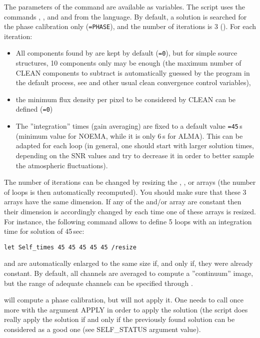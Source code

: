 The parameters of the command  are available as 
 \sic{} variables.  The script uses the commands 
, , and   and  from the 
 language. By default, a solution is searched for the 
phase calibration only (\texttt{=PHASE}), and 
the number of iterations is 3 (). For each 
iteration: 
\begin{itemize}\itemsep 0pt
\item All components found by  are kept by default 
(\texttt{=0}), but for simple source structures, 10 components only 
may be enough (the maximum number  of  CLEAN components to 
subtract is automatically guessed by the program in the default 
process, see  and other usual clean convergence control 
variables),
\item the minimum flux density per pixel to be considered by CLEAN can 
be defined (\texttt{=0}) 
\item The ''integration'' times (gain averaging) are fixed to a default 
value \texttt{=45}\,s (minimum value for NOEMA, while it is only 
6\,s for ALMA). This can be adapted for each loop (in general, one 
should start with larger solution times, depending on the SNR values 
and try to decrease it in order to better sample the atmospheric 
fluctuations). 
\end{itemize}
The number of iterations can be changed by resizing the 
, , or  
arrays (the number of loops  is then automatically 
recomputed). You should make sure that these 3 arrays have the same 
dimension. If any of the  and/or 
 array are constant then their dimension is 
accordingly changed by  each time one of these arrays is 
resized. For instance, the following command allows to define 5 loops 
with an integration time for solution of 45\,sec:

\texttt{let Self\_times 45 45 45 45 45 /resize}

 and  are automatically enlarged
to the same size if, and only if, they were already constant.
By default, all channels are averaged to compute a 
''continuum'' image, but  the range of adequate channels can be 
specified through . 

 will compute a phase calibration, but will not 
apply it. One needs to call  once more with the argument 
APPLY in order to apply the solution (the script does really apply the 
solution if and only if the previously found solution can be considered 
as a good one (see SELF\_{STATUS} argument value). 

